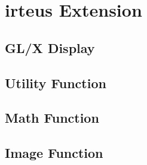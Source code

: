 \section{irteus Extension}
 \subsection{GL/X Display}
  
  
 \subsection{Utility Function}
 
 
 \subsection{Math Function}
 
 \subsection{Image Function}
 
 
